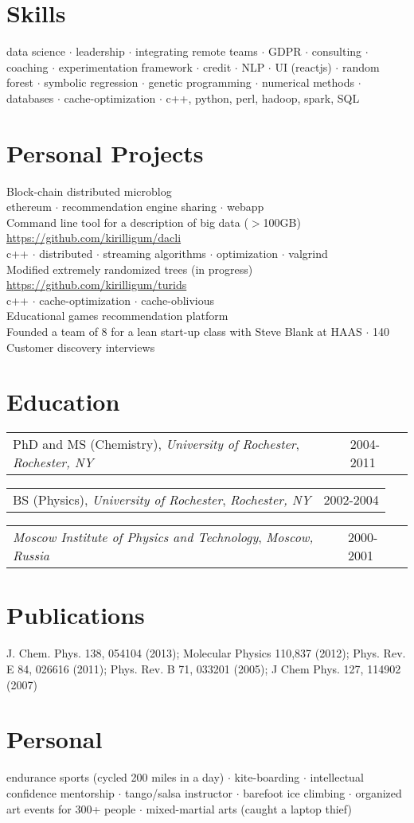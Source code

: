 \documentclass{res}
\makeatletter
\newcommand{\af}[3]{
\begin{tabular*}{\textwidth}[t]{@{}p{5.2in} l} 
    #1, \textit{#2} & #3\\
  \end{tabular*}
}
\newcommand{\skills}[2]{
  #1\\
  {\color[RGB]{106,106,106} #2}\\
}
\makeatother
\begin{document}
\begin{resume}
\section{Skills}
    data science $\cdot$
    leadership $\cdot$
    integrating remote teams $\cdot$
    GDPR $\cdot$
    consulting $\cdot$
    coaching $\cdot$
    experimentation framework $\cdot$
	credit $\cdot$
	NLP $\cdot$
	UI (reactjs) $\cdot$
	random forest $\cdot$
	symbolic regression $\cdot$
	genetic programming $\cdot$
	numerical methods $\cdot$
	databases $\cdot$
	cache-optimization $\cdot$
	c++, python, perl, hadoop, spark, SQL
\\

\section{Personal Projects}
\skills{Block-chain distributed microblog}{
	ethereum $\cdot$
	recommendation engine sharing $\cdot$
	webapp
}
\skills{Command line tool for a description of big data ($>$100GB) \url{https://github.com/kirilligum/dacli}}{
	c++ $\cdot$
	distributed $\cdot$
	streaming algorithms $\cdot$
	optimization $\cdot$
	valgrind
}
\skills{Modified extremely randomized trees (in progress) \url{https://github.com/kirilligum/turids}}{
	c++ $\cdot$
	cache-optimization $\cdot$
	cache-oblivious
}
\skills{Educational games recommendation platform}{
  Founded a team of 8 for a lean start-up class with Steve Blank at HAAS $\cdot$ 
  140 Customer discovery interviews
}

\section{Education}          
\af{PhD and MS (Chemistry), \textit{University of Rochester}}{Rochester, NY}{2004-2011}
\af{BS (Physics), \textit{University of Rochester}}{Rochester, NY}{2002-2004}
\af{\textit{Moscow Institute of Physics and Technology}}{Moscow, Russia} {2000-2001}
\section{Publications}
  J. Chem. Phys.  138, 054104 (2013);
  Molecular Physics 110,837 (2012);
  Phys. Rev. E 84, 026616 (2011);
  Phys. Rev. B 71, 033201 (2005);
  J Chem Phys. 127, 114902 (2007)
\\

\section{Personal}          
endurance sports (cycled 200 miles in a day) $\cdot$
kite-boarding $\cdot$
intellectual confidence mentorship $\cdot$
tango/salsa instructor $\cdot$
barefoot ice climbing $\cdot$
organized art events for 300+ people $\cdot$
mixed-martial arts (caught a laptop thief)
 
\end{resume}
\end{document}
